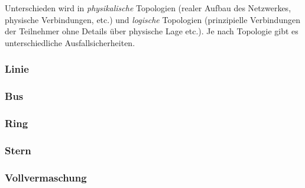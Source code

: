 Unterschieden wird in \emph{physikalische} Topologien (realer Aufbau des Netzwerkes, physische Verbindungen, etc.) und \emph{logische} Topologien (prinzipielle Verbindungen der Teilnehmer ohne Details über physische Lage etc.). Je nach Topologie gibt es unterschiedliche Ausfallsicherheiten.

\subsubsection{Linie}

\begin{figure}[H]
\centering
{}
\end{figure}

\subsubsection{Bus}

\begin{figure}[H]
\centering
{}
\end{figure}

\subsubsection{Ring}

\begin{figure}[H]
\centering
{}
\end{figure}

\subsubsection{Stern}

\begin{figure}[H]
\centering
{}
\end{figure}

\subsubsection{Vollvermaschung}

\begin{figure}[H]
\centering
{}
\end{figure}
